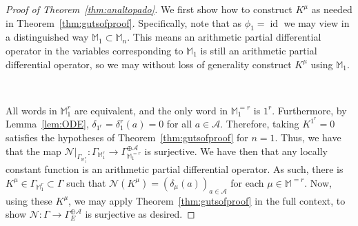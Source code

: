 \documentclass[10pt]{amsart}
\theoremstyle{Theorem}
\theoremstyle{definition}
\newcommand{\id}{\operatorname{id}}
\newcommand{\cA}{\mathcal{A}}
\def\cN{\mathcal{N}}
\begin{document}
\begin{proof}[Proof of Theorem~\ref{thm:analtopado}] We first show how to construct $K^\mu$ as needed in Theorem~\ref{thm:gutsofproof}. Specifically, note that as $\phi_1 = \id$ we may view in a distinguished way $\mathbb{M}_1 \subset \mathbb{M}_n$. This means an arithmetic partial differential operator in the variables corresponding to $\mathbb{M}_1$ is still an arithmetic partial differential operator, so we may without loss of generality construct $K^\mu$ using $\mathbb{M}_1$.

\


All words in $\mathbb{M}_1^{r}$ are equivalent, and the only word in $\mathbb M_1^{=r}$ is $1^r$.  Furthermore, by Lemma~\ref{lem:ODE}, $\delta_{1^r} = \delta_1^r(a) = 0$ for all $a\in \cA$.  Therefore, taking $K^{1^r} = 0$ satisfies the hypotheses of Theorem~\ref{thm:gutsofproof} for $n = 1$.  Thus, we have that the map $\cN|_{\Gamma_{\mathbb{M}^r_1}}:\Gamma_{\mathbb{M}^r_1}\to \Gamma_{\mathbb{M}^{=r}_1}^{\oplus \cA}$ is surjective. We have then that any locally constant function is an arithmetic partial differential operator. As such, there is $K^\mu \in \Gamma_{\mathbb{M}^r_1} \subset \Gamma$ such that $\cN(K^\mu) = (\delta_\mu(a))_{a\in \cA}$ for each $\mu\in\mathbb{M}^{=r}$. Now, using these $K^\mu$, we may apply Theorem~\ref{thm:gutsofproof} in the full context, to show $\cN:\Gamma\to \Gamma_E^{\oplus \cA}$ is surjective as desired.	
\end{proof}
\end{document}
